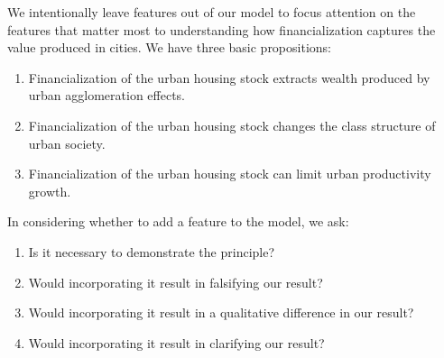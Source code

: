 We intentionally leave features out of our model to focus attention on the features that matter most to understanding how financialization captures the value produced in cities. We have three basic propositions:
\begin{enumerate}
    \item Financialization of the urban housing stock extracts wealth produced by urban agglomeration effects. 
    \item Financialization of the urban housing stock changes the class structure of urban society. 
    \item Financialization of the urban housing stock can limit urban productivity growth. 
\end{enumerate}
In considering whether to add a feature to the model, we ask: %
\begin{enumerate}
    \item Is it necessary to demonstrate the principle? 
    \item Would incorporating it result in falsifying our result?
    \item Would incorporating it result in a qualitative difference in our result?
    \item Would incorporating it result in clarifying our result?
\end{enumerate}

